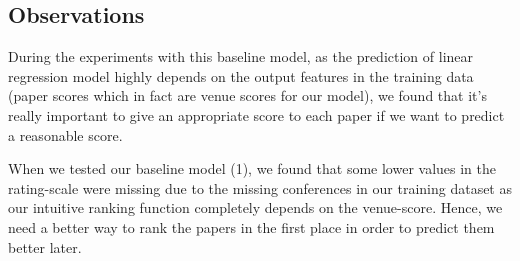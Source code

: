 \documentclass[a4paper, 11pt]{article}
\begin{document}
\subsection{Observations}

During the experiments with this baseline model, as the prediction of linear regression model highly depends on the output features in the training data (paper scores which in fact are venue scores for our model), we found that it's really important to give an appropriate score to each paper if we want to predict a reasonable score. 

\vspace{0.2cm}


When we tested our baseline model (1), we found that some lower values in the rating-scale were missing due to the missing conferences in our training dataset as our intuitive ranking function completely depends on the venue-score. Hence, we need a better way to rank the papers in the first place in order to predict them better later.

\end{document}
